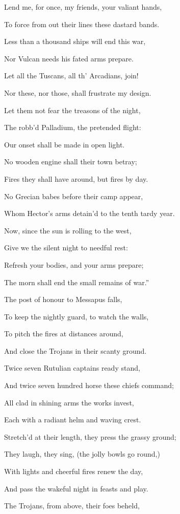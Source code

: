 Lend me, for once, my friends, your valiant hands,

To force from out their lines these dastard bands.

Less than a thousand ships will end this war,

Nor Vulcan needs his fated arms prepare.

Let all the Tuscans, all th’ Arcadians, join!

Nor these, nor those, shall frustrate my design.

Let them not fear the treasons of the night,

The robb’d Palladium, the pretended flight:

Our onset shall be made in open light.

No wooden engine shall their town betray;

Fires they shall have around, but fires by day.

No Grecian babes before their camp appear,

Whom Hector’s arms detain’d to the tenth tardy year.

Now, since the sun is rolling to the west,

Give we the silent night to needful rest:

Refresh your bodies, and your arms prepare;

The morn shall end the small remains of war.”

The post of honour to Messapus falls,

To keep the nightly guard, to watch the walls,

To pitch the fires at distances around,

And close the Trojans in their scanty ground.

Twice seven Rutulian captains ready stand,

And twice seven hundred horse these chiefs command;

All clad in shining arms the works invest,

Each with a radiant helm and waving crest.

Stretch’d at their length, they press the grassy ground;

They laugh, they sing, (the jolly bowls go round,)

With lights and cheerful fires renew the day,

And pass the wakeful night in feasts and play.

The Trojans, from above, their foes beheld,

